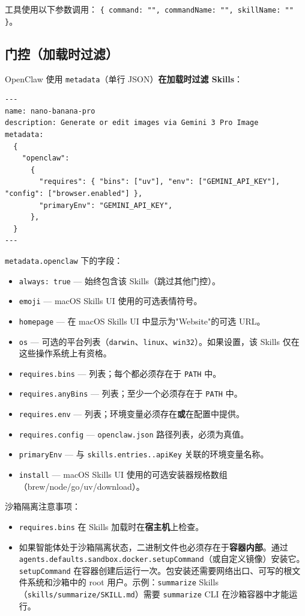 工具使用以下参数调用：
\texttt{\{ command: "", commandName: "", skillName: "" \}}。

\subsection{门控（加载时过滤）}


OpenClaw 使用 \texttt{metadata}（单行 JSON）\textbf{在加载时过滤 Skills}：

\begin{lstlisting}
---
name: nano-banana-pro
description: Generate or edit images via Gemini 3 Pro Image
metadata:
  {
    "openclaw":
      {
        "requires": { "bins": ["uv"], "env": ["GEMINI_API_KEY"], "config": ["browser.enabled"] },
        "primaryEnv": "GEMINI_API_KEY",
      },
  }
---
\end{lstlisting}


\texttt{metadata.openclaw} 下的字段：

\begin{itemize}
  \item \texttt{always: true} — 始终包含该 Skills（跳过其他门控）。
  \item \texttt{emoji} — macOS Skills UI 使用的可选表情符号。
  \item \texttt{homepage} — 在 macOS Skills UI 中显示为"Website"的可选 URL。
  \item \texttt{os} — 可选的平台列表（\texttt{darwin}、\texttt{linux}、\texttt{win32}）。如果设置，该 Skills 仅在这些操作系统上有资格。
  \item \texttt{requires.bins} — 列表；每个都必须存在于 \texttt{PATH} 中。
  \item \texttt{requires.anyBins} — 列表；至少一个必须存在于 \texttt{PATH} 中。
  \item \texttt{requires.env} — 列表；环境变量必须存在\textbf{或}在配置中提供。
  \item \texttt{requires.config} — \texttt{openclaw.json} 路径列表，必须为真值。
  \item \texttt{primaryEnv} — 与 \texttt{skills.entries..apiKey} 关联的环境变量名称。
  \item \texttt{install} — macOS Skills UI 使用的可选安装器规格数组（brew/node/go/uv/download）。
\end{itemize}


沙箱隔离注意事项：

\begin{itemize}
  \item \texttt{requires.bins} 在 Skills 加载时在\textbf{宿主机}上检查。
  \item 如果智能体处于沙箱隔离状态，二进制文件也必须存在于\textbf{容器内部}。通过 \texttt{agents.defaults.sandbox.docker.setupCommand}（或自定义镜像）安装它。\texttt{setupCommand} 在容器创建后运行一次。包安装还需要网络出口、可写的根文件系统和沙箱中的 root 用户。示例：\texttt{summarize} Skills（\texttt{skills/summarize/SKILL.md}）需要 \texttt{summarize} CLI 在沙箱容器中才能运行。
\end{itemize}


